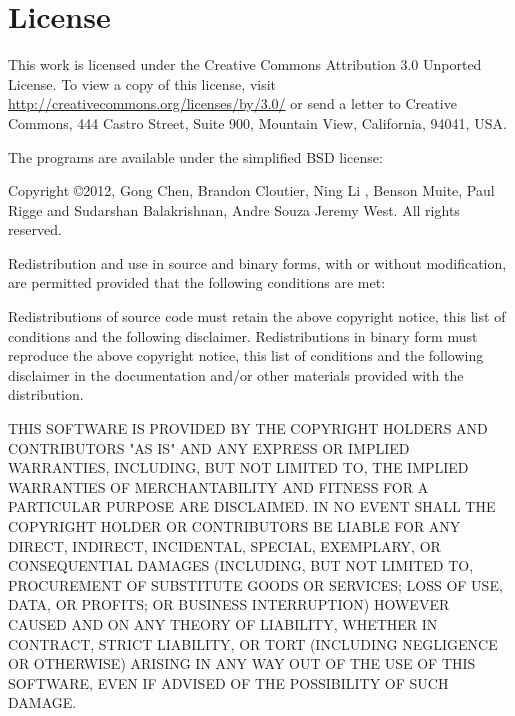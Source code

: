 \chapter*{License}
This work is licensed under the Creative Commons Attribution 3.0 Unported
License. To view a copy of this license, visit
\url{http://creativecommons.org/licenses/by/3.0/} or send a letter to Creative
Commons, 444 Castro Street, Suite 900, Mountain View, California, 94041, USA.

The programs are available under the simplified BSD license:

Copyright \copyright 2012, Gong Chen, Brandon Cloutier, Ning Li , Benson Muite, Paul Rigge and Sudarshan Balakrishnan, Andre Souza Jeremy West. All rights reserved.

Redistribution and use in source and binary forms, with or without modification, are permitted provided that the following conditions are met:

    Redistributions of source code must retain the above copyright notice, this list of conditions and the following disclaimer.
    Redistributions in binary form must reproduce the above copyright notice, this list of conditions and the following disclaimer in the documentation and/or other materials provided with the distribution.

THIS SOFTWARE IS PROVIDED BY THE COPYRIGHT HOLDERS AND CONTRIBUTORS "AS IS" AND ANY EXPRESS OR IMPLIED WARRANTIES, INCLUDING, BUT NOT LIMITED TO, THE IMPLIED WARRANTIES OF MERCHANTABILITY AND FITNESS FOR A PARTICULAR PURPOSE ARE DISCLAIMED. IN NO EVENT SHALL THE COPYRIGHT HOLDER OR CONTRIBUTORS BE LIABLE FOR ANY DIRECT, INDIRECT, INCIDENTAL, SPECIAL, EXEMPLARY, OR CONSEQUENTIAL DAMAGES (INCLUDING, BUT NOT LIMITED TO, PROCUREMENT OF SUBSTITUTE GOODS OR SERVICES; LOSS OF USE, DATA, OR PROFITS; OR BUSINESS INTERRUPTION) HOWEVER CAUSED AND ON ANY THEORY OF LIABILITY, WHETHER IN CONTRACT, STRICT LIABILITY, OR TORT (INCLUDING NEGLIGENCE OR OTHERWISE) ARISING IN ANY WAY OUT OF THE USE OF THIS SOFTWARE, EVEN IF ADVISED OF THE POSSIBILITY OF SUCH DAMAGE.